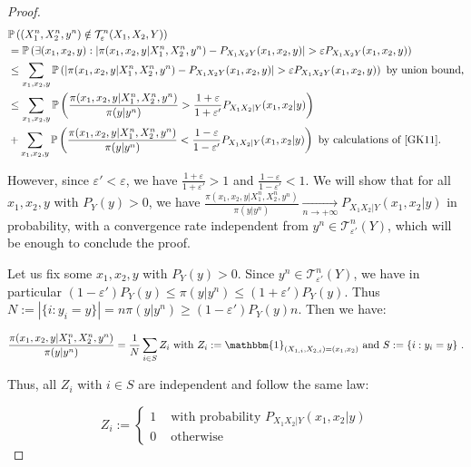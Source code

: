 \documentclass[11pt]{article}
\theoremstyle{definition}
\theoremstyle{remark}
\begin{document}
\begin{proof}
        \begin{equation}
          \begin{aligned}
            &\mathbb{P}\left((X_1^n,X_2^n,y^n) \notin \mathcal{T}^n_{\varepsilon}(X_1,X_2,Y) \right)\\
            &= \mathbb{P}\left(\exists (x_1,x_2,y) : |\pi(x_1,x_2,y|X_1^n,X_2^n,y^n) - P_{X_1X_2Y}(x_1,x_2,y)| > \varepsilon P_{X_1X_2Y}(x_1,x_2,y) \right) \\
            &\leq \sum_{x_1,x_2,y} \mathbb{P}\left(|\pi(x_1,x_2,y|X_1^n,X_2^n,y^n) - P_{X_1X_2Y}(x_1,x_2,y)| > \varepsilon P_{X_1X_2Y}(x_1,x_2,y) \right) \text{ by union bound,} \\
            &\leq \sum_{x_1,x_2,y} \mathbb{P}\left(\frac{\pi(x_1,x_2,y|X_1^n,X_2^n,y^n)}{\pi(y|y^n)} > \frac{1+\varepsilon}{1+\varepsilon'}P_{X_1X_2|Y}(x_1,x_2|y) \right)\\
            &+ \sum_{x_1,x_2,y} \mathbb{P}\left(\frac{\pi(x_1,x_2,y|X_1^n,X_2^n,y^n)}{\pi(y|y^n)} < \frac{1-\varepsilon}{1-\varepsilon'}P_{X_1X_2|Y}(x_1,x_2|y) \right)  \text{ by calculations of~\cite{GK11}.}\\
          \end{aligned}
        \end{equation}

        However, since $\varepsilon' < \varepsilon$, we have $\frac{1+\varepsilon}{1+\varepsilon'} > 1$ and $\frac{1-\varepsilon}{1-\varepsilon'} < 1$. We will show that for all $x_1,x_2,y$ with $P_Y(y) > 0$, we have $\frac{\pi(x_1,x_2,y|X_1^n,X_2^n,y^n)}{\pi(y|y^n)} \underset{n \rightarrow +\infty}{\rightarrow} P_{X_1X_2|Y}(x_1,x_2|y)$ in probability, with a convergence rate independent from $y^n \in \mathcal{T}^n_{\varepsilon'}(Y)$, which will be enough to conclude the proof.

        Let us fix some $x_1,x_2,y$ with $P_Y(y) > 0$. Since $y^n \in \mathcal{T}^n_{\varepsilon'}(Y)$, we have in particular $(1-\varepsilon')P_Y(y) \leq \pi(y|y^n) \leq (1+\varepsilon')P_Y(y)$. Thus $N := |\{i:y_i=y\}| = n\pi(y|y^n) \geq (1-\varepsilon')P_Y(y)n$. Then we have:

        \[ \frac{\pi(x_1,x_2,y|X_1^n,X_2^n,y^n)}{\pi(y|y^n)} = \frac{1}{N}\sum_{i \in S}Z_i \text{ with }Z_i := \mathbbm{1}_{(X_{1,i},X_{2,i})=(x_1,x_2)} \text{ and } S := \{i:y_i=y\}\ . \]

        Thus, all $Z_i$ with $i \in S$ are independent and follow the same law:
        
          \[ Z_i := \begin{cases}
            1 & \text{ with probability } P_{X_1X_2|Y}(x_1,x_2|y) \\
            0 & \text{ otherwise}
          \end{cases}
          \]



\end{proof}
\end{document}
